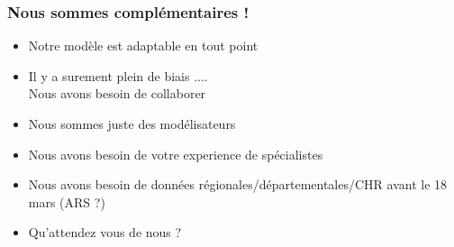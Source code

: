 \documentclass[a4paper]{cours-bdd}
\begin{document}
  



\begin{frame}[fragile]
  \frametitle{Nous sommes complémentaires !}

  \begin{itemize}
  \item Notre modèle est adaptable en tout point
  \item Il y a surement plein de biais .... \\ Nous avons besoin de
    collaborer
  \end{itemize}

  \bigskip

  
  \begin{itemize}
    \item Nous sommes juste des modélisateurs
    \item Nous avons besoin de votre experience de spécialistes
    \item Nous avons besoin de données régionales/départementales/CHR avant le 18 mars (ARS ?)
    \item Qu'attendez vous de nous ?
    \end{itemize}

  
\end{frame}
\end{document}
